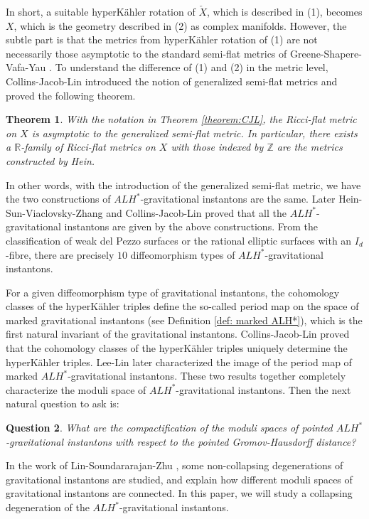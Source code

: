 \documentclass[11pt]{amsart}
\theoremstyle{plain}
\newtheorem{thm}{Theorem}[section]
\newtheorem{que}[thm]{Question}
\theoremstyle{definition}
\numberwithin{equation}{section}
\begin{document}
In short, a suitable hyperK\"ahler rotation of $\check{X}$, which is described in (1), becomes $X$, which is the geometry described in (2) as complex manifolds. However, the subtle part is that the metrics from hyperK\"ahler rotation of (1) are not necessarily those asymptotic to the standard semi-flat metrics of Greene-Shapere-Vafa-Yau \cite{GSVY}. To understand the difference of (1) and (2) in the metric level, Collins-Jacob-Lin introduced the notion of generalized semi-flat metrics and proved the following theorem.
\begin{thm} \cite{CJL2}
    With the notation in Theorem \ref{theorem:CJL}, the Ricci-flat metric on $X$ is asymptotic to the generalized semi-flat metric. In particular, there exists a $\mathbb{R}$-family of Ricci-flat metrics on $X$ with those indexed by $\mathbb{Z}$ are the metrics constructed by Hein.  
\end{thm}
In other words, with the introduction of the generalized semi-flat metric, we have the two constructions of $ALH^*$-gravitational instantons are the same. Later Hein-Sun-Viaclovsky-Zhang \cite{HSVZ2} and Collins-Jacob-Lin \cite{CJL3} proved that all the $ALH^*$-gravitational instantons are given by the above constructions. From the classification of weak del Pezzo surfaces or the rational elliptic surfaces with an $I_d$-fibre, there are precisely $10$ diffeomorphism types of $ALH^*$-gravitational instantons. 

For a given diffeomorphism type of gravitational instantons, the cohomology classes of the hyperK\"ahler triples define the so-called period map on the space of marked gravitational instantons (see Definition \ref{def: marked ALH*}), which is the first natural invariant of the gravitational instantons. Collins-Jacob-Lin \cite{CJL3} proved that the cohomology classes of the hyperK\"ahler triples uniquely determine the hyperK\"ahler triples. Lee-Lin later \cite{LL} characterized the image of the period map of marked $ALH^*$-gravitational instantons. These two results together completely characterize the moduli space of $ALH^*$-gravitational instantons. Then the next natural question to ask is:
\begin{que}
	What are the compactification of the moduli spaces of pointed $ALH^*$-gravitational instantons with respect to the pointed Gromov-Hausdorff distance? 
\end{que}	
In the work of Lin-Soundararajan-Zhu \cite{LSZ}, some non-collapsing degenerations of gravitational instantons are studied, and explain how different moduli spaces of gravitational instantons are connected. In this paper, we will study a collapsing degeneration of the $ALH^*$-gravitational instantons. 
\end{document}
